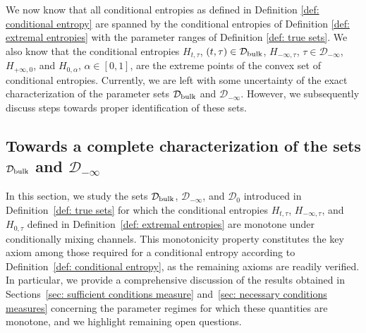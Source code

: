 \documentclass[aps,pra,11pt,onecolumn,nofootinbib,tightenlines]{revtex4-2}
\theoremstyle{definition}
\newcommand{\D}{\mathcal{D}}
\newcommand{\Y}{\mathcal{Y}}
\newcommand{\mc}[1]{\mathcal{#1}}
\begin{document}
We now know that all conditional entropies as defined in Definition \ref{def: conditional entropy} are spanned by the conditional entropies of Definition \ref{def: extremal entropies} with the parameter ranges of Definition \ref{def: true sets}. We also know that the conditional entropies $H_{t,\tau}$, $(t,\tau)\in\mc D_{\rm bulk}$, $H_{-\infty,\tau}$, $\tau\in\mc D_{-\infty}$, $H_{+\infty,0}$, and $H_{0,\alpha}$, $\alpha\in[0,1]$, are the extreme points of the convex set of conditional entropies. Currently, we are left with some uncertainty of the exact characterization of the parameter sets $\mc D_{\rm bulk}$ and $\mc D_{-\infty}$. However, we subsequently discuss steps towards proper identification of these sets.


\bigskip

\subsection{Towards a complete characterization of the sets $\D_{\rm bulk}$ and $\D_{-\infty}$}
\label{sec: towards complete characterization}
In this section, we study the sets $\D_{\rm bulk}$, $\D_{-\infty}$, and $\D_0$ introduced in Definition~\ref{def: true sets} for which the conditional entropies $H_{t,\tau}$, $H_{-\infty,\tau}$, and $H_{0,\tau}$ defined in Definition~\ref{def: extremal entropies} are monotone under conditionally mixing channels. This monotonicity property constitutes the key axiom among those required for a conditional entropy according to Definition~\ref{def: conditional entropy}, as the remaining axioms are readily verified.
In particular, we provide a comprehensive discussion of the results obtained in Sections~\ref{sec: sufficient conditions measure} and~\ref{sec: necessary conditions measures} concerning the parameter regimes for which these quantities are monotone, and we highlight remaining open questions.
\end{document}
